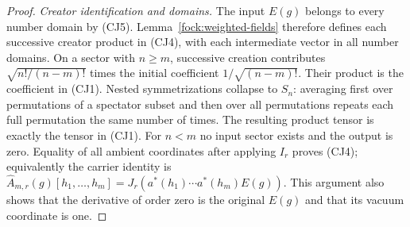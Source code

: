 \documentclass[11pt,a4paper]{article}
\theoremstyle{definition}
\theoremstyle{remark}
\begin{document}
\begin{proof}
\emph{Creator identification and domains.}
The input $E(g)$ belongs to every number domain by (CJ5).
Lemma~\ref{fock:weighted-fields} therefore defines each successive
creator product in (CJ4), with each intermediate vector in all
number domains. On a sector with $n\geq m$, successive creation
contributes $\sqrt{n!/(n-m)!}$ times the initial coefficient
$1/\sqrt{(n-m)!}$. Their product is the coefficient in (CJ1).
Nested symmetrizations collapse to $S_n$: averaging first over
permutations of a spectator subset and then over all permutations
repeats each full permutation the same number of times.
The resulting product tensor is exactly the tensor in (CJ1).
For $n<m$ no input sector exists and the output is zero.
Equality of all ambient coordinates after applying $I_r$ proves (CJ4);
equivalently the carrier identity is
$\widehat A_{m,r}(g)[h_1,\ldots,h_m]
 =J_r(a^*(h_1)\cdots a^*(h_m)E(g))$. This argument also
shows that the derivative of order zero is the original $E(g)$
and that its vacuum coordinate is one.
\end{proof}
\end{document}
